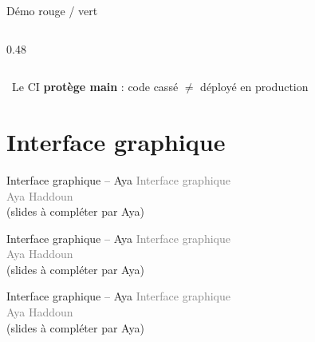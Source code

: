 \documentclass[aspectratio=169, 12pt]{beamer}
\begin{document}
\begin{frame}{Démo rouge / vert}
\begin{columns}[c]
\begin{column}{0.48\textwidth}
\end{column}
\end{columns}

\vspace{0.4cm}
\centering
\small \textcolor{ucablue}{\faShieldAlt}~Le CI \textbf{protège main} : code cassé $\neq$ déployé en production

\end{frame}


\section{Interface graphique}

\begin{frame}{Interface graphique -- Aya}
\centering
\vspace{2cm}
{\Large\textcolor{gray}{Interface graphique}}\\[0.5cm]
{\large\textcolor{gray}{Aya Haddoun}}\\[1cm]
\textcolor{gray!50}{\scriptsize (slides à compléter par Aya)}
\end{frame}

\begin{frame}{Interface graphique -- Aya}
\centering
\vspace{2cm}
{\Large\textcolor{gray}{Interface graphique}}\\[0.5cm]
{\large\textcolor{gray}{Aya Haddoun}}\\[1cm]
\textcolor{gray!50}{\scriptsize (slides à compléter par Aya)}
\end{frame}

\begin{frame}{Interface graphique -- Aya}
\centering
\vspace{2cm}
{\Large\textcolor{gray}{Interface graphique}}\\[0.5cm]
{\large\textcolor{gray}{Aya Haddoun}}\\[1cm]
\textcolor{gray!50}{\scriptsize (slides à compléter par Aya)}
\end{frame}
\end{document}

